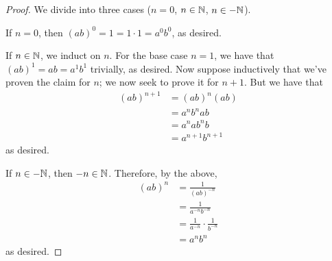 \documentclass[../notes.tex]{subfiles}
\begin{document}
\begin{enumerate}[label={\textbf{\arabic*.}}]
\begin{proof}
        We divide into three cases ($n=0$, $n\in\mathbb{N}$, $n\in-\mathbb{N}$).\par\smallskip
        If $n=0$, then $(ab)^0=1=1\cdot 1=a^0b^0$, as desired.\par
        If $n\in\mathbb{N}$, we induct on $n$. For the base case $n=1$, we have that $(ab)^1=ab=a^1b^1$ trivially, as desired. Now suppose inductively that we've proven the claim for $n$; we now seek to prove it for $n+1$. But we have that
        \begin{align*}
            (ab)^{n+1} &= (ab)^n(ab)\\
            &= a^nb^nab\\
            &= a^nab^nb\\
            &= a^{n+1}b^{n+1}
        \end{align*}
        as desired.\par
        If $n\in-\mathbb{N}$, then $-n\in\mathbb{N}$. Therefore, by the above,
        \begin{align*}
            (ab)^n &= \frac{1}{(ab)^{-n}}\\
            &= \frac{1}{a^{-n}b^{-n}}\\
            &= \frac{1}{a^{-n}}\cdot\frac{1}{b^{-n}}\\
            &= a^nb^n
        \end{align*}
        as desired.
    \end{proof}
\end{enumerate}
\end{document}
